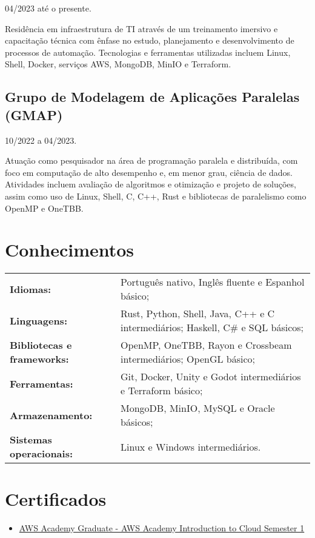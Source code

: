\documentclass[11pt]{article}
\begin{document}
04/2023 até o presente.

Residência em infraestrutura de TI através de um treinamento imersivo e
capacitação técnica com ênfase no estudo, planejamento e desenvolvimento de
processos de automação. Tecnologias e ferramentas utilizadas incluem Linux,
Shell, Docker, serviços AWS, MongoDB, MinIO e Terraform.

\subsection*{Grupo de Modelagem de Aplicações Paralelas (GMAP) \hfill {}}

10/2022 a 04/2023.

Atuação como pesquisador na área de programação paralela e distribuída, com
foco em computação de alto desempenho e, em menor grau, ciência de dados.
Atividades incluem avaliação de algoritmos e otimização e projeto de soluções,
assim como uso de Linux, Shell, C, C++, Rust e bibliotecas de paralelismo como
OpenMP e OneTBB.

\section*{Conhecimentos}

\begin{tabular}{ l l }
	\textbf{Idiomas:} & Português nativo, Inglês fluente e Espanhol básico; \\
	\textbf{Linguagens:} & Rust, Python, Shell, Java, C++ e C intermediários; Haskell, C\# e SQL básicos; \\
	\textbf{Bibliotecas e frameworks:} & OpenMP, OneTBB, Rayon e Crossbeam intermediários; OpenGL básico; \\
	\textbf{Ferramentas:} & Git, Docker, Unity e Godot intermediários e Terraform básico; \\
	\textbf{Armazenamento:} & MongoDB, MinIO, MySQL e Oracle básicos; \\
	\textbf{Sistemas operacionais:} & Linux e Windows intermediários. \\
\end{tabular}

\section*{Certificados}

\begin{itemize}
	\item \href{https://www.credly.com/badges/69bb404e-ae99-4a93-96b1-228fa98d0859/public_url}{AWS Academy Graduate - AWS Academy Introduction to Cloud Semester 1}
\end{itemize}
\end{document}
